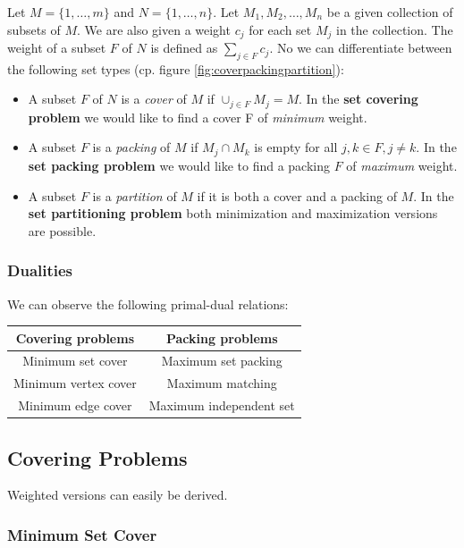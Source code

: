 Let $M = \{1, \ldots, m\}$ and $N=\{1, \ldots, n\}$. Let $M_1, M_2, \ldots, M_n$ be a given collection of subsets of $M$. We are also given a weight $c_j$ for each set $M_j$ in the collection. The weight of a subset $F$ of $N$ is defined as $\sum_{j \in F}c_j$. No we can differentiate between the following set types (cp. figure \ref{fig:coverpackingpartition}):

\begin{itemize}
	\item{A subset $F$ of $N$ is a \emph{cover} of $M$ if $\cup_{j \in F}M_j = M$. In the \textbf{set covering problem} we would like to find a cover F of \emph{minimum} weight.}
	\item{A subset $F$ is a \emph{packing} of $M$ if $M_j \cap M_k$ is empty for all $j,k \in F, j \neq k$. In the \textbf{set packing problem} we would like to find a packing $F$ of \emph{maximum} weight.}
	\item{A subset $F$ is a \emph{partition} of $M$ if it is both a cover and a packing of $M$. In the \textbf{set partitioning problem} both minimization and maximization versions are possible.}
\end{itemize}

\subsubsection{Dualities}
We can observe the following primal-dual relations:

\begin{center}
\begin{tabular}{c|c}
\textbf{Covering problems} & \textbf{Packing problems}\\
\hline
Minimum set cover &	Maximum set packing\\
Minimum vertex cover & Maximum matching\\
Minimum edge cover & Maximum independent set\\
\end{tabular}
\end{center}

\subsection{Covering Problems}

Weighted versions can easily be derived.

\subsubsection{Minimum Set Cover}

